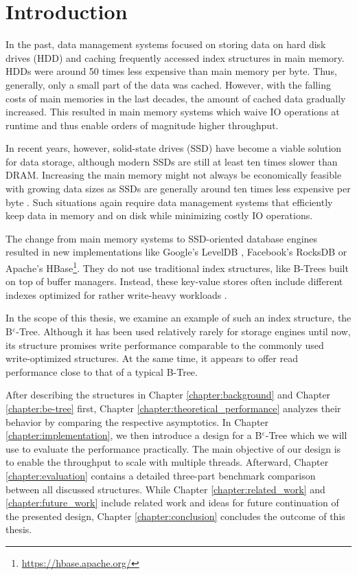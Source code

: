 
\chapter{Introduction}\label{chapter:introduction}

In the past, data management systems focused on storing data on hard disk drives (HDD) and caching frequently accessed index structures in main memory. HDDs were around 50 times less expensive than main memory per byte. Thus, generally, only a small part of the data was cached. However, with the falling costs of main memories in the last decades, the amount of cached data gradually increased. This resulted in main memory systems which waive IO operations at runtime and thus enable orders of magnitude higher throughput. \cite{cost_performance_in_modern_data_stores}

In recent years, however, solid-state drives (SSD) have become a viable solution for data storage, although modern SSDs are still at least ten times slower than DRAM. Increasing the main memory might not always be economically feasible with growing data sizes as SSDs are generally around ten times less expensive per byte \cite{leanstore}. Such situations again require data management systems that efficiently keep data in memory and on disk while minimizing costly IO operations.

The change from main memory systems to SSD-oriented database engines resulted in new implementations like Google's LevelDB \cite{leveldb}, Facebook's RocksDB \cite{rocksdb} or Apache's HBase\footnote{\href{https://hbase.apache.org/}{https://hbase.apache.org/}}. They do not use traditional index structures, like B-Trees built on top of buffer managers. Instead, these key-value stores often include different indexes optimized for rather write-heavy workloads \cite{key_value_stores}.

In the scope of this thesis, we examine an example of such an index structure, the B$^\varepsilon$-Tree. Although it has been used relatively rarely for storage engines until now, its structure promises write performance comparable to the commonly used write-optimized structures. At the same time, it appears to offer read performance close to that of a typical B-Tree. \cite{b_epsilon_tree}

After describing the structures in Chapter \ref{chapter:background} and Chapter \ref{chapter:be-tree} first, Chapter \ref{chapter:theoretical_performance} analyzes their behavior by comparing the respective asymptotics. In Chapter \ref{chapter:implementation}, we then introduce a design for a B$^\varepsilon$-Tree which we will use to evaluate the performance practically. The main objective of our design is to enable the throughput to scale with multiple threads. Afterward, Chapter \ref{chapter:evaluation} contains a detailed three-part benchmark comparison between all discussed structures. While Chapter \ref{chapter:related_work} and \ref{chapter:future_work} include related work and ideas for future continuation of the presented design, Chapter \ref{chapter:conclusion} concludes the outcome of this thesis. 